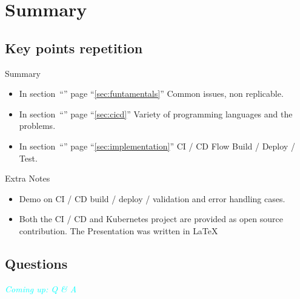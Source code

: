 \section{Summary}
\subsection{Key points repetition}

\begin{frame}
	\begin{exampleblock}{Summary}
		\begin{itemize}[<+->]
			\item In section~``'' page ``\ref{sec:funtamentals}'' Common issues, non replicable.
			\item In section~``'' page ``\ref{sec:cicd}'' Variety of programming languages and the problems.
			\item In section~``'' page ``\ref{sec:implementation}'' CI / CD Flow Build / Deploy / Test. \pause
		\end{itemize}
	\end{exampleblock}
	\begin{exampleblock}{Extra Notes}
		\begin{itemize}[<+->]
			\item Demo on CI / CD build / deploy / validation and error handling cases.
			\item Both the CI / CD and Kubernetes project are provided as open source contribution. The Presentation was written in \alert{\LaTeX}
		\end{itemize}
	\end{exampleblock}
\end{frame}

\subsection*{Questions}
\begin{frame}
	\begin{center}
		\Huge \textcolor{cyan}{\emph{Coming up: Q \& A}}
	\end{center}
\end{frame}